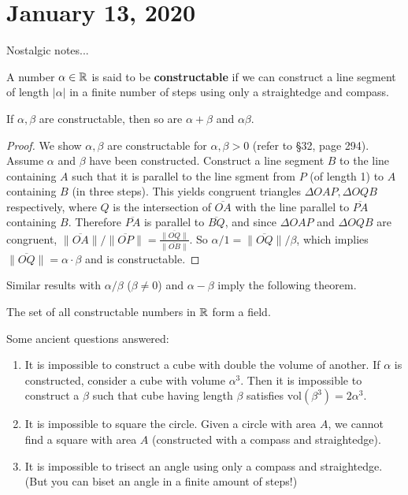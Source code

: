 \section{January 13, 2020}
Nostalgic notes...
\begin{definition}[]
    A number $\alpha  \in \mathbb{R}$ is said to be \textbf{constructable} if we can construct a line segment of length $|\alpha |$ in a finite number of steps using only a straightedge and compass.
\end{definition}
\begin{theorem}
    If $\alpha ,\beta $ are constructable, then so are $\alpha +\beta $ and $\alpha \beta $.
\end{theorem}
\begin{proof}
    We show $\alpha ,\beta $ are constructable for $\alpha ,\beta >0$ (refer to \cite{fraleigh} \S 32, page 294). Assume $\alpha $ and $\beta $ have been constructed. Construct a line segment $B$ to the line containing $A$ such that it is parallel to the line sgment from $P$ (of length 1) to $A$ containing $B$ (in three steps). This yields congruent triangles $\Delta OAP,\Delta OQB$ respectively, where $Q$ is the intersection of $\overline{OA}$ with the line parallel to $\overline{PA}$ containing $B$. Therefore $\overline{PA}$ is parallel to $\overline{BQ}$, and since $\Delta OAP$ and $\Delta OQB$ are congruent, $\| \overline{OA}\| / \| \overline{OP}\|= \frac{\| \overline{OQ}\|}{\| \overline{OB}\|}$. So $\alpha  /1= \| \overline{OQ}\| / \beta $, which implies $\| \overline{OQ}\|=\alpha \cdot \beta $ and is constructable. 
\end{proof}
Similar results with $\alpha /\beta $ ($\beta \neq 0$) and $\alpha -\beta $ imply the following theorem.
\begin{theorem}
    The set of all constructable numbers in $\mathbb{R}$ form a field.
\end{theorem}
Some ancient questions answered:
\begin{enumerate}[label=(\arabic*)]
\setlength\itemsep{-.2em}
    \item It is impossible to construct a cube with double the volume of another. If $\alpha $ is constructed, consider a cube with volume $\alpha ^3$. Then it is impossible to construct a $\beta $ such that cube having length $\beta $ satisfies $\mathrm{vol}(\beta ^3)=2\alpha ^3$.
    \item It is impossible to square the circle. Given a circle with area $A$, we cannot find a square with area $A$ (constructed with a compass and straightedge).
    \item It is impossible to trisect an angle using only a compass and straightedge. (But you can biset an angle in a finite amount of steps!)
\end{enumerate}
